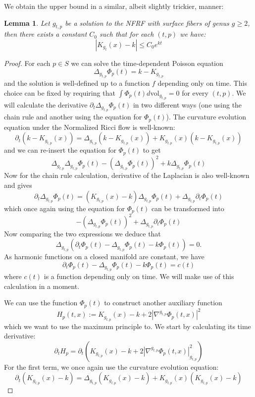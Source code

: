 \documentclass{article}
\theoremstyle{plain}
\newtheorem{lem}{Lemma}[section]
\theoremstyle{remark}
\theoremstyle{definition}
\begin{document}
We obtain the upper bound in a similar, albeit slightly trickier, manner\thinspace:
\begin{lem}
    Let $g_{t,p}$ be a solution to the NFRF with surface fibers of genus $g\geq 2$, then there exists a constant $C_0$ such that for each $(t,p)$ we have\thinspace:
    $$|K_{g_t}(x)-k| \leq C_0 e^{kt}$$ 
\end{lem}
\begin{proof}
    For each $p\in S$ we can solve the time-dependent Poisson equation 
    $$\Delta_{g_{t,p}} \Phi_p(t) = k-K_{g_{t,p}}$$
    and the solution is well-defined up to a function $f$ depending only on time. This choice can be fixed by requiring that $\int \Phi_p(t) d\text{vol}_{g_{t,p}} = 0$ for every $(t,p)$. We will calculate the derivative $\partial_t \Delta_{g_{t,p}} \Phi_p(t)$ in two different ways (one using the chain rule and another using the equation for $\Phi_p(t)$). The curvature evolution equation under the Normalized Ricci flow is well-known\thinspace:
    $$\partial_t (k-K_{g_{t,p}}(x))=\Delta_{g_{t,p}}(k-K_{g_{t,p}}(x))+K_{g_{t,p}}(x)(k-K_{g_{t,p}}(x))$$
    and we can re-insert the equation for $\Phi_p(t)$ to get
    $$\Delta_{g_{t,p}}\Delta_{g_{t,p}}\Phi_p(t)-(\Delta_{g_{t,p}}\Phi_p(t))^2+k\Delta_{g_{t,p}}\Phi_p(t)$$
    Now for the chain rule calculation, derivative of the Laplacian is also well-known and gives
    $$\partial_t \Delta_{g_{t,p}} \Phi_p(t)=(K_{g_{t,p}}(x)-k)\Delta_{g_{t,p}}\Phi_p(t)+\Delta_{g_{t,p}}\partial_t\Phi_p(t)$$
    which once again using the equation for $\Phi_p(t)$ can be transformed into
    $$-(\Delta_{g_{t,p}}\Phi_p(t))^2+\Delta_{g_{t,p}}\partial_t\Phi_p(t)$$
    Now comparing the two expressions we deduce that 
    $$\Delta_{g_{t,p}}(\partial_t\Phi_p(t)-\Delta_{g_{t,p}}\Phi_p(t)-k\Phi_p(t))=0.$$
    As harmonic functions on a closed manifold are constant, we have 
    $$\partial_t\Phi_p(t)-\Delta_{g_{t,p}}\Phi_p(t)-k\Phi_p(t)=c(t)$$
    where $c(t)$ is a function depending only on time. We will make use of this calculation in a moment. \par 
    We can use the function $\Phi_p(t)$ to construct another auxiliary function 
    $$H_p(t,x):= K_{g_{t,p}}(x)-k + 2|\nabla^{g_{t,p}}\Phi_p(t,x)|^2$$
    which we want to use the maximum principle to. We start by calculating its time derivative\thinspace:
    $$
        \partial_t H_p= \partial_t(K_{g_{t,p}}(x)-k + 2|\nabla^{g_{t,p}}\Phi_p(t,x)|_{g_{t,p}}^2)
    $$
    For the first term, we once again use the curvature evolution equation:
    $$\partial_t (K_{g_{t,p}}(x)-k)=\Delta_{g_{t,p}}(K_{g_{t,p}}(x)-k)+K_{g_{t,p}}(x)(K_{g_{t,p}}(x)-k)$$

\end{proof}
\end{document}

